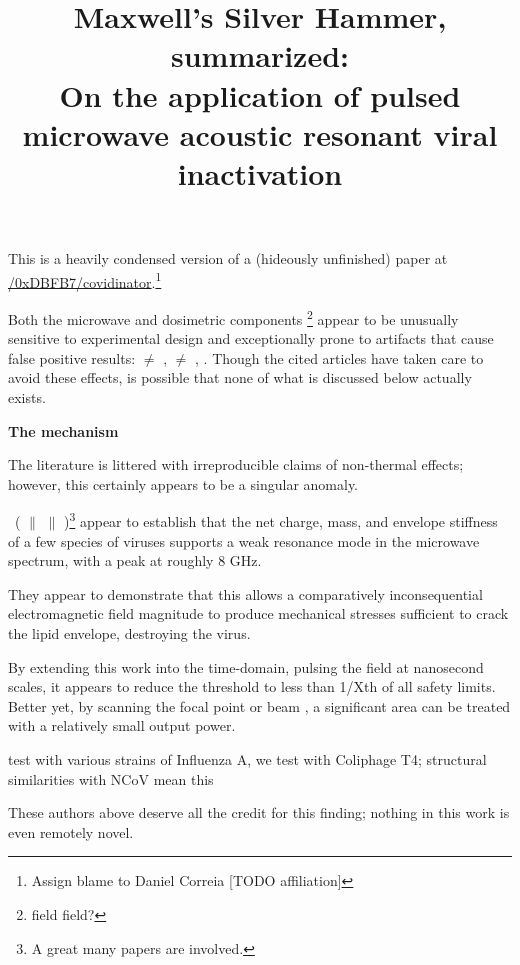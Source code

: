 \documentclass[fleqn,10pt]{paper}
\title{Maxwell's Silver Hammer, summarized:\\ On the application of pulsed microwave acoustic resonant viral inactivation}
\begin{document}
\maketitle


This is a heavily condensed version of a (hideously unfinished) paper at \href{https://www.github.com/0xDBFB7/covidinator/documents/paper.pdf}{\faGithub/0xDBFB7/covidinator}.\footnote{Assign blame to Daniel Correia [TODO affiliation] }

Both the microwave and dosimetric components \footnote{field field?} appear to be unusually sensitive to experimental design and exceptionally prone to artifacts that cause false positive results: \cite{Microwave1982} $\neq$ \cite{Resonances1987}, \cite{Effects1985a} $\neq$ \cite{Cytogenetic1986}, \cite{Comprehensive2018}. Though the cited articles have taken care to avoid these effects, is possible that none of what is discussed below actually exists.  

{\Large \textbf{The mechanism}}

The literature is littered with irreproducible claims of non-thermal effects; however, this certainly appears to be a singular anomaly.

\cite{Microwave2009} \textrightarrow \ (\cite{focusing2014} $\parallel$ \cite{Efficient2015} $\parallel$ \cite{Resonant2017})\footnote{A great many papers are involved.} appear to establish that the net charge, mass, and envelope stiffness of a few species of viruses supports a weak resonance mode in the microwave spectrum, with a peak at roughly 8 GHz.

They appear to demonstrate that this allows a comparatively inconsequential electromagnetic field magnitude to produce mechanical stresses sufficient to crack the lipid envelope, destroying the virus.

By extending this work into the time-domain, pulsing the field at nanosecond scales, it appears to reduce the threshold to less than 1/Xth of all safety limits. Better yet, by scanning the focal point or beam , a significant area can be treated with a relatively small output power.

\cite{Efficient2015} test with various strains of Influenza A, we test with Coliphage T4; structural similarities with NCoV mean this



These authors above deserve all the credit for this finding; nothing in this work is even remotely novel.
\end{document}
